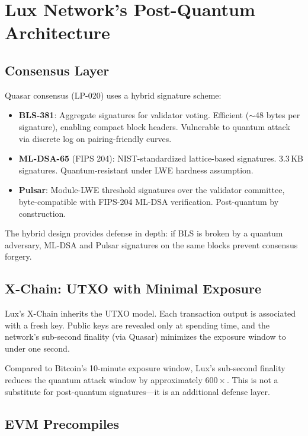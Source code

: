 \section{Lux Network's Post-Quantum Architecture}


\subsection{Consensus Layer}

Quasar consensus (LP-020) uses a hybrid signature scheme:

\begin{itemize}[nosep]
  \item \textbf{BLS-381}: Aggregate signatures for validator voting.
        Efficient ($\sim$48 bytes per signature), enabling compact block
        headers. Vulnerable to quantum attack via discrete log on
        pairing-friendly curves.
  \item \textbf{ML-DSA-65} (FIPS 204): NIST-standardized lattice-based
        signatures. 3.3\,KB signatures. Quantum-resistant under LWE
        hardness assumption.
  \item \textbf{Pulsar}: Module-LWE threshold signatures over the
        validator committee, byte-compatible with FIPS-204 ML-DSA
        verification. Post-quantum by construction.
\end{itemize}

The hybrid design provides defense in depth: if BLS is broken by a
quantum adversary, ML-DSA and Pulsar signatures on the same blocks
prevent consensus forgery.

\subsection{X-Chain: UTXO with Minimal Exposure}

Lux's X-Chain inherits the UTXO model. Each transaction output is
associated with a fresh key. Public keys are revealed only at spending
time, and the network's sub-second finality (via Quasar) minimizes
the exposure window to under one second.

\begin{remark}
Compared to Bitcoin's 10-minute exposure window, Lux's sub-second
finality reduces the quantum attack window by approximately
$600\times$. This is not a substitute for post-quantum signatures---it
is an additional defense layer.
\end{remark}

\subsection{EVM Precompiles}

